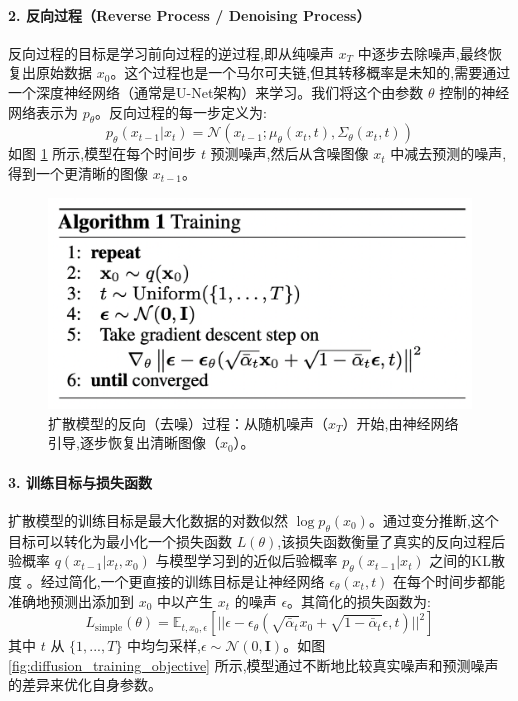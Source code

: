 \begin{itemize}
    \paragraph{2. 反向过程（Reverse Process / Denoising Process）}
    反向过程的目标是学习前向过程的逆过程,即从纯噪声 $x_T$ 中逐步去除噪声,最终恢复出原始数据 $x_0$。这个过程也是一个马尔可夫链,但其转移概率是未知的,需要通过一个深度神经网络（通常是U-Net架构）来学习。我们将这个由参数 $\theta$ 控制的神经网络表示为 $p_\theta$。反向过程的每一步定义为:
    $$ p_\theta(x_{t-1} | x_t) = \mathcal{N}(x_{t-1}; \mu_\theta(x_t, t), \Sigma_\theta(x_t, t)) $$
    如图 \ref{fig:diffusion_reverse_process} 所示,模型在每个时间步 $t$ 预测噪声,然后从含噪图像 $x_t$ 中减去预测的噪声,得到一个更清晰的图像 $x_{t-1}$。
    
    \begin{figure}[htbp]
        \centering
        \includegraphics[width=\textwidth]{figures/D2.png}
        \caption{扩散模型的反向（去噪）过程：从随机噪声（$x_T$）开始,由神经网络引导,逐步恢复出清晰图像（$x_0$）。}
        \label{fig:diffusion_reverse_process}
    \end{figure}

    \paragraph{3. 训练目标与损失函数}
    扩散模型的训练目标是最大化数据的对数似然 $\log p_\theta(x_0)$。通过变分推断,这个目标可以转化为最小化一个损失函数 $L(\theta)$,该损失函数衡量了真实的反向过程后验概率 $q(x_{t-1} | x_t, x_0)$ 与模型学习到的近似后验概率 $p_\theta(x_{t-1} | x_t)$ 之间的KL散度 \cite{315}。经过简化,一个更直接的训练目标是让神经网络 $\epsilon_\theta(x_t, t)$ 在每个时间步都能准确地预测出添加到 $x_0$ 中以产生 $x_t$ 的噪声 $\epsilon$。其简化的损失函数为:
    $$ L_{\text{simple}}(\theta) = \mathbb{E}_{t, x_0, \epsilon} \left[ || \epsilon - \epsilon_\theta(\sqrt{\bar{\alpha}_t}x_0 + \sqrt{1 - \bar{\alpha}_t}\epsilon, t) ||^2 \right] $$
    其中 $t$ 从 $\{1, ..., T\}$ 中均匀采样,$\epsilon \sim \mathcal{N}(0, \mathbf{I})$。如图 \ref{fig:diffusion_training_objective} 所示,模型通过不断地比较真实噪声和预测噪声的差异来优化自身参数。
    

\end{itemize}
